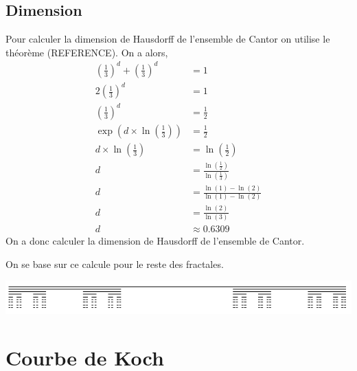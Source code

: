 \documentclass[a4paper, 12pt]{report}
\begin{document}
			\subsection{Dimension}
				Pour calculer la dimension de Hausdorff de l'ensemble de Cantor on utilise le théorème (REFERENCE). On a alors,
				\begin{align*}
					\left(\frac{1}{3}\right)^d+\left(\frac{1}{3}\right)^d	&=1\\
											  2\left(\frac{1}{3}\right)^d	&=1\\
											   \left(\frac{1}{3}\right)^d	&=\frac{1}{2}\\
						\exp\left(d\times\ln\left(\frac{1}{3}\right)\right)	&=\frac{1}{2} \tag{Passage à la forme exponentielle}\\
										d\times\ln\left(\frac{1}{3}\right)	&=\ln\left(\frac{1}{2}\right)\\
																		d	&=\frac{\ln\left(\frac{1}{2}\right)}{\ln\left(\frac{1}{3}\right)}\\
																		d	&=\frac{\ln(1)-\ln(2)}{\ln(1)-\ln(2)}\\
																		d	&=\frac{\ln(2)}{\ln(3)} \tag{$\ln(1)$=0}\\
																		d	&\approx 0.6309
				\end{align*}
				On a donc calculer la dimension de Hausdorff de l'ensemble de Cantor.
				
				
				On se base sur ce calcule pour le reste des fractales.
				
				
				\includegraphics[scale=0.8]{Images/cantor}
		\newpage
		\section{Courbe de Koch}
\end{document}
